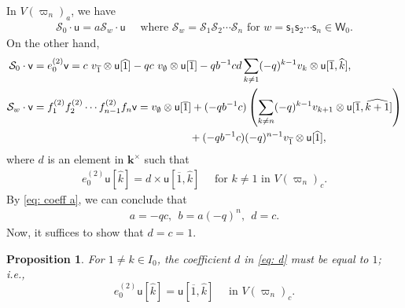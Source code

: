 \documentclass[11pt, leqno]{amsart}
\newtheorem{proposition}[theorem]{Proposition}
\theoremstyle{definition}
\numberwithin{equation}{section}
\begin{document}
In $V({\varpi}_{n})_a$, we have
\begin{align}\label{eq: coeff a}
 \mathcal{S}_0 \cdot \mathsf{u} = a \mathcal{S}_w \cdot \mathsf{u} \quad \text{ where } \mathcal{S}_w=\mathcal{S}_1\mathcal{S}_2\cdots\mathcal{S}_n
\text{ for }  w=\mathsf{s}_1\mathsf{s}_2\cdots \mathsf{s}_n \in \mathsf{W}_0.
\end{align}
On the other hand,
\begin{align*}
\mathcal{S}_0 \cdot \mathsf{v} & = e_0^{(2)}\mathsf{v}= c \ v_{\overline{1}} \otimes \mathsf{u}[\widehat{1}]
-q c \ v_{\emptyset} \otimes \mathsf{u}[\overline{1}] - qb^{-1}cd \sum_{k \ne 1} (-q)^{k-1} v_k \otimes \mathsf{u}[\overline{1},\widehat{k}], \allowdisplaybreaks \\
\mathcal{S}_w \cdot \mathsf{v} & = f_1^{(2)}f_2^{(2)}\cdots f_{n-1}^{(2)}f_n\mathsf{v} = v_\emptyset \otimes \mathsf{u}[\overline{1}]
+ (-qb^{-1}c) \left( \sum_{k \ne n} (-q)^{k-1} v_{k+1} \otimes \mathsf{u}[\overline{1},\widehat{k+1}] \right) \\ & \hspace{34ex}
+(-qb^{-1}c)(-q)^{n-1} v_{\overline{1}} \otimes \mathsf{u}[\widehat{1}],
\end{align*}
where $d$ is an element in ${\mathbf{k}}^\times$ such that
\begin{align} \label{eq: d}
 e_0^{(2)} \mathsf{u}[\widehat{k}]=d \times \mathsf{u}[\overline{1},\widehat{k}] \quad \text{ for $k \ne 1$ in } V({\varpi}_n)_c.
\end{align}
By \eqref{eq: coeff a}, we can conclude that
\begin{align} \label{eq: abc}a=-qc, \ \ b=a(-q)^n, \ \ d=c.\end{align}
Now, it suffices to show that $d=c=1$.

\begin{proposition} For $1 \ne k \in I_0$, the coefficient $d$ in \eqref{eq: d} must be equal to $1$; i.e.,
$$e_0^{(2)} \mathsf{u}[\widehat{k}]=\mathsf{u}[\overline{1},\widehat{k}] \quad \text{ in } V({\varpi}_n)_c.$$
\end{proposition}
\end{document}
